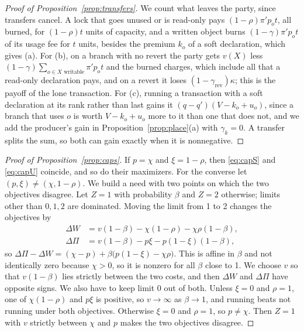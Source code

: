 \documentclass[conference,compsoc]{IEEEtran}
\numberwithin{equation}{section}
\theoremstyle{plain}
\theoremstyle{definition}
\theoremstyle{remark}
\begin{document}
\begin{proof}[Proof of Proposition~\ref{prop:transfers}]
We count what leaves the party, since transfers cancel. A lock that goes unused or is read-only pays $(1-\rho)\pi' p_o t$, all burned, for $(1-\rho)t$ units of capacity, and a written object burns $(1-\gamma)\pi' p_o t$ of its usage fee for $t$ units, besides the premium $k_o$ of a soft declaration, which gives (a). For (b), on a branch with no revert the party gets $v(X)$ less $(1-\gamma)\sum_{o \in X \text{ writable}}\pi' p_o t$ and the burned charges, which include all that a read-only declaration pays, and on a revert it loses $(1-\gamma_{\mathrm{rev}})\kappa$; this is the payoff of the lone transaction. For (c), running a transaction with a soft declaration at its rank rather than last gains it $(q-q')(V - k_o + u_o)$, since a branch that uses $o$ is worth $V - k_o + u_o$ more to it than one that does not, and we add the producer's gain in Proposition~\ref{prop:place}(a) with $\gamma_k = 0$. A transfer splits the sum, so both can gain exactly when it is nonnegative.
\end{proof}

\begin{proof}[Proof of Proposition~\ref{prop:caps}]
If $p = \chi$ and $\xi = 1 - \rho$, then \eqref{eq:capS} and \eqref{eq:capU} coincide, and so do their maximizers. For the converse let $(p,\xi) \ne (\chi, 1-\rho)$. We build a need with two points on which the two objectives disagree. Let $Z = 1$ with probability $\beta$ and $Z = 2$ otherwise; limits other than $0, 1, 2$ are dominated. Moving the limit from 1 to 2 changes the objectives by
\begin{align*}
\Delta W &= v(1-\beta) - \chi(1-\rho) - \chi\rho(1-\beta),\\
\Delta \Pi &= v(1-\beta) - p\xi - p(1-\xi)(1-\beta),
\end{align*}
so $\Delta \Pi - \Delta W = (\chi - p) + \beta\bigl(p(1-\xi) - \chi\rho\bigr)$. This is affine in $\beta$ and not identically zero because $\chi > 0$, so it is nonzero for all $\beta$ close to 1. We choose $v$ so that $v(1-\beta)$ lies strictly between the two costs, and then $\Delta W$ and $\Delta \Pi$ have opposite signs. We also have to keep limit $0$ out of both. Unless $\xi = 0$ and $\rho = 1$, one of $\chi(1-\rho)$ and $p\xi$ is positive, so $v \to \infty$ as $\beta \to 1$, and running beats not running under both objectives. Otherwise $\xi = 0$ and $\rho = 1$, so $p \ne \chi$. Then $Z = 1$ with $v$ strictly between $\chi$ and $p$ makes the two objectives disagree.
\end{proof}
\end{document}
